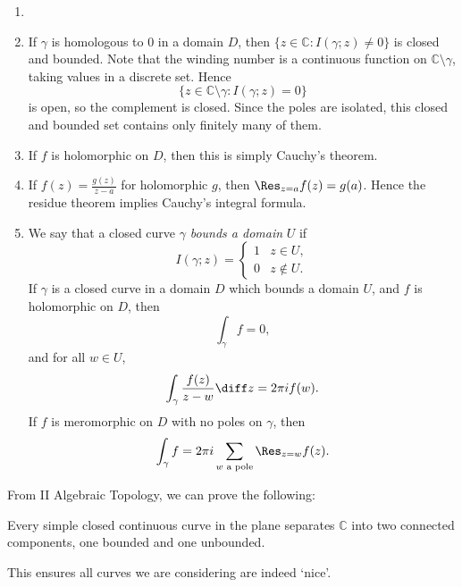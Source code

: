 \documentclass[12pt]{article}
\begin{document}
\begin{remark}
	\begin{enumerate}
		\item[]
		\item If $\gamma$ is homologous to $0$ in a domain $D$, then $\{z \in \mathbb{C} : I(\gamma; z) \neq 0\}$ is closed and bounded. Note that the winding number is a continuous function on $\mathbb{C} \setminus \gamma$, taking values in a discrete set. Hence
			\[
				\{z \in \mathbb{C} \setminus \gamma : I(\gamma; z) = 0\}
			\]
			is open, so the complement is closed. Since the poles are isolated, this closed and bounded set contains only finitely many of them.
		\item If $f$ is holomorphic on $D$, then this is simply Cauchy's theorem.
		\item If $f(z) = \frac{g(z)}{z-a}$ for holomorphic $g$, then $\Res_{z=a} f(z) = g(a)$. Hence the residue theorem implies Cauchy's integral formula.
		\item We say that a closed curve $\gamma$ \emph{bounds a domain} $U$ if
			\[
			I(\gamma;z) =
			\begin{cases}
				1 & z \in U,\\
				0 & z \notin U.
			\end{cases}
			\]
			If $\gamma$ is a closed curve in a domain $D$ which bounds a domain $U$, and $f$ is holomorphic on $D$, then
			\[
			\int_\gamma f = 0,
			\]
			and for all $w \in U$,
			\[
			\int_\gamma \frac{f(z)}{z - w} \diff z = 2 \pi i f(w).
			\]
			If $f$ is meromorphic on $D$ with no poles on $\gamma$, then
			\[
				\int_\gamma f = 2 \pi i \sum_{w \text{ a pole}} \Res_{z=w} f(z).
			\]
	\end{enumerate}	
\end{remark}

From II Algebraic Topology, we can prove the following:
\begin{theorem}
	Every simple closed continuous curve in the plane separates $\mathbb{C}$ into two connected components, one bounded and one unbounded.
\end{theorem}

This ensures all curves we are considering are indeed `nice'.
\end{document}
